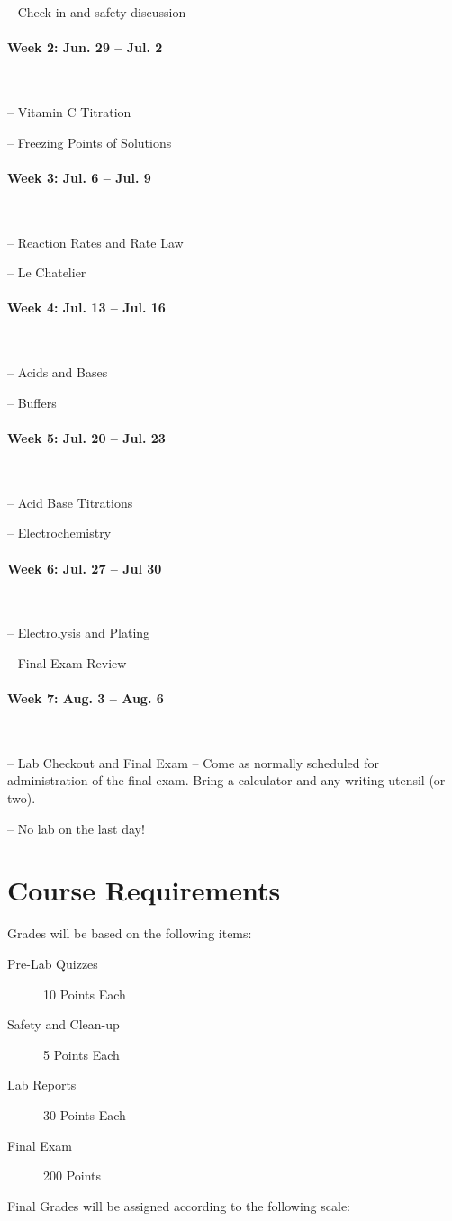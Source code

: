 \documentclass[12pt, letterpaper]{article}
\begin{document}
-- Check-in and safety discussion

\paragraph{Week 2: Jun. 29 -- Jul. 2}~

-- Vitamin C Titration

-- Freezing Points of Solutions

\paragraph{Week 3: Jul. 6 -- Jul. 9}~

-- Reaction Rates and Rate Law

-- Le Chatelier

\paragraph{Week 4: Jul. 13 -- Jul. 16}~

-- Acids and Bases

-- Buffers

\paragraph{Week 5: Jul. 20 -- Jul. 23}~

-- Acid Base Titrations

-- Electrochemistry

\paragraph{Week 6: Jul. 27 -- Jul 30}~

-- Electrolysis and Plating

-- Final Exam Review

\paragraph{Week 7: Aug. 3 -- Aug. 6}~

-- Lab Checkout and Final Exam -- Come as normally scheduled for administration of the final exam. Bring a calculator and any writing utensil (or two).

-- No lab on the last day!

\section*{Course Requirements}
Grades will be based on the following items:
\begin{description}
  \item[Pre-Lab Quizzes] 10 Points Each
  \item[Safety and Clean-up] 5 Points Each
  \item[Lab Reports] 30 Points Each
  \item[Final Exam] 200 Points
\end{description}
Final Grades will be assigned according to the following scale:
\end{document}
